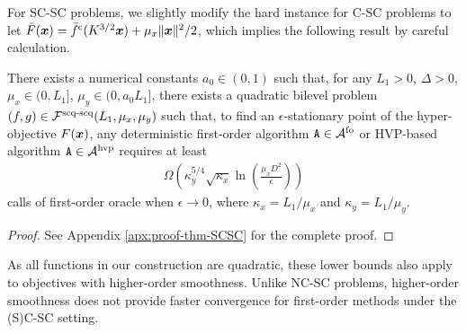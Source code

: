 \documentclass{article}
\begin{document}
For SC-SC problems, we slightly modify the hard instance for C-SC problems to let $\bar F({\bm{x}}) = \bar f^{\rm c} (K^{3/2} {\bm{x}}) + \mu_x \Vert {\bm{x}} \Vert^2/2$, which implies the following result by careful calculation. 

\begin{thm} \label{thm:SC-SC}
There exists a numerical constants $a_0 \in (0,1)$ such that, 
for any $ L_1>0$, $\Delta >0$, $\mu_x \in (0, L_1]$, $\mu_y \in (0, a_0 L_1]$, there exists a quadratic bilevel problem $( f, g) \in {\mathcal{F}}^{\text{scq-scq}}(L_1, \mu_x, \mu_y)$ such that, to find an $\epsilon$-stationary point of the  hyper-objective  $F({\bm{x}})$, any deterministic first-order algorithm $\texttt{A} \in {\mathcal{A}}^{\rm fo}$ or HVP-based algorithm $\texttt{A} \in {\mathcal{A}}^{\rm hvp}$ requires at least
    \begin{align*}
        \Omega \left( \kappa_y^{5/4} 
 \sqrt{\kappa_x} \ln \left( \frac{\mu_x D^2}{\epsilon}  \right) \right)
    \end{align*}
calls of first-order oracle when $\epsilon \rightarrow 0$, where $\kappa_x = L_1/\mu_x$ and $\kappa_y = L_1/\mu_y$.
\end{thm}

\begin{proof}
    See Appendix \ref{apx:proof-thm-SCSC} for the complete proof.
\end{proof}


As all functions in our construction are quadratic, these lower bounds also apply to objectives with higher-order smoothness. 
Unlike NC-SC problems, higher-order smoothness
does not provide faster convergence for first-order methods under the (S)C-SC setting. %
\end{document}
